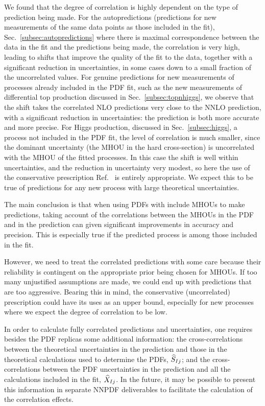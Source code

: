 We found that the degree of correlation is highly dependent on the type of prediction being made. For the autopredictions (predictions for new measurements of the same data points as those included in the fit), Sec.~\ref{subsec:autopredictions} where there is maximal correspondence between the data in the fit and the predictions being made, the correlation is very high, leading to shifts that improve the quality of the fit to the data, together with a significant reduction in uncertainties, in some cases down to a small fraction of the uncorrelated values. For genuine predictions for new measurements of processes already included in the PDF fit, such as the new measurements of differential top production discussed in Sec.~\ref{subsec:topnhiggs}, we observe that the shift takes the correlated NLO predictions very close to the NNLO prediction, with a significant reduction in uncertainties: the prediction is both more accurate and more precise. For Higgs production, discussed in Sec.~\ref{subsec:higgs}, a process not included in the PDF  fit, the level of correlation is much smaller, since the dominant uncertainty (the MHOU in the hard cross-section) is uncorrelated with the MHOU of the fitted processes. In this case the shift is well within uncertainties, and the reduction in uncertainty very modest, so here the use of the conservative prescription Ref.~\cite{AbdulKhalek:2019ihb} is entirely appropriate. We expect this to be true of predictions for any new process with large theoretical uncertainties.

The main conclusion is that when using PDFs with include MHOUs to make predictions, taking account of the correlations between the MHOUs in the PDF and in the prediction can given significant improvements in accuracy and precision. This is especially true if the predicted process is among those included in the fit. 

However, we need to treat the correlated predictions with some care because their reliability is contingent on the appropriate prior being chosen for MHOUs. If too many unjustified assumptions are made, we could end up with predictions that are too aggressive. Bearing this in mind, the conservative (uncorrelated) prescription could have its uses as an upper bound, especially for new processes where we expect the degree of correlation to be low.

In order to calculate fully correlated predictions and uncertainties, one requires besides the PDF replicas some additional  information: the cross-correlations between the theoretical uncertainties in the prediction and those in the theoretical calculations used to determine the PDFs,  $\widehat{S}_{Ij}$; and the cross-correlations between the PDF uncertainties in the prediction and all the calculations included in the fit, $\widehat{X}_{Ij}$.  In the future, it may be possible to present this information in separate NNPDF deliverables to facilitate the calculation of the correlation effects.

